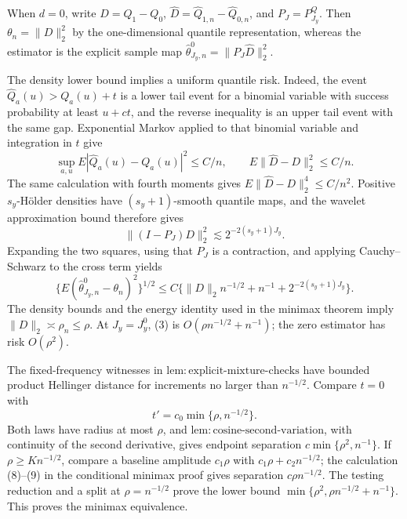 When \(d=0\), write \(D=Q_{1}-Q_{0}\), \(\widehat D=\widehat Q_{1,n}-\widehat Q_{0,n}\), and \(P_J=P^Q_{J_y}\). Then \(\theta_n=\|D\|_2^2\) by the one-dimensional quantile representation, whereas the estimator is the explicit sample map \(\widehat\theta^0_{J_y,n}=\|P_J\widehat D\|_2^2\).

The density lower bound implies a uniform quantile risk. Indeed, the event \(\widehat Q_a(u)>Q_a(u)+t\) is a lower tail event for a binomial variable with success probability at least \(u+ct\), and the reverse inequality is an upper tail event with the same gap. Exponential Markov applied to that binomial variable and integration in \(t\) give
\[
\sup_{a,u}E|\widehat Q_a(u)-Q_a(u)|^2\le C/n,
\qquad E\|\widehat D-D\|_2^2\le C/n.                                \tag{1}
\]
The same calculation with fourth moments gives \(E\|\widehat D-D\|_2^4\le C/n^2\). Positive \(s_y\)-H\"older densities have \((s_y+1)\)-smooth quantile maps, and the wavelet approximation bound therefore gives
\[
\|(I-P_J)D\|_2^2\lesssim2^{-2(s_y+1)J_y}.                            \tag{2}
\]
Expanding the two squares, using that \(P_J\) is a contraction, and applying Cauchy--Schwarz to the cross term yields
\[
\{E(\widehat\theta^0_{J_y,n}-\theta_n)^2\}^{1/2}
\le C\{\|D\|_2n^{-1/2}+n^{-1}+2^{-2(s_y+1)J_y}\}.                 \tag{3}
\]
The density bounds and the energy identity used in the minimax theorem imply \(\|D\|_2\asymp\rho_n\le\rho\). At \(J_y=J_y^0\), (3) is \(O(\rho n^{-1/2}+n^{-1})\); the zero estimator has risk \(O(\rho^2)\).

The fixed-frequency witnesses in \(\mathrm{lem{:}explicit\text{-}mixture\text{-}checks}\) have bounded product Hellinger distance for increments no larger than \(n^{-1/2}\). Compare \(t=0\) with
\[
t'=c_0\min\{\rho,n^{-1/2}\}.
\]
Both laws have radius at most \(\rho\), and \(\mathrm{lem{:}cosine\text{-}second\text{-}variation}\), with continuity of the second derivative, gives endpoint separation \(c\min\{\rho^2,n^{-1}\}\). If \(\rho\ge Kn^{-1/2}\), compare a baseline amplitude \(c_1\rho\) with \(c_1\rho+c_2n^{-1/2}\); the calculation (8)--(9) in the conditional minimax proof gives separation \(c\rho n^{-1/2}\). The testing reduction and a split at \(\rho=n^{-1/2}\) prove the lower bound \(\min\{\rho^2,\rho n^{-1/2}+n^{-1}\}\). This proves the minimax equivalence.

